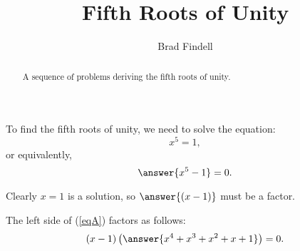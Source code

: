 \documentclass[space,nooutcomes]{ximera}
\title{Fifth Roots of Unity}
\author{Brad Findell}
\begin{document}
\begin{abstract}
A sequence of problems deriving the fifth roots of unity.   
\end{abstract}
\maketitle



\begin{problem}

To find the fifth roots of unity, we need to solve the equation: 
\begin{equation}
x^5 = 1,
\end{equation}
or equivalently, 
\begin{equation} \label{eqA}
\answer{x^5 - 1} = 0.
\end{equation}

\begin{problem}
Clearly $x=1$ is a solution, so $\answer{(x-1)}$ must be a factor.  

\begin{problem}
The left side of (\ref{eqA}) factors as follows: 
\begin{equation}
(x-1)\left(\answer{x^4+x^3+x^2+x+1}\right)=0.
\end{equation}
\end{problem}
\end{problem}
\end{problem}
\end{document}
